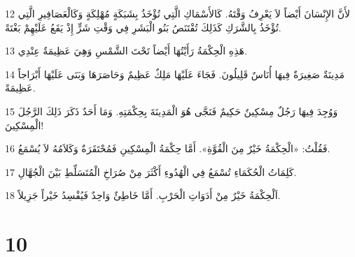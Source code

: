 \par 12 لأَنَّ الإِنْسَانَ أَيْضاً لاَ يَعْرِفُ وَقْتَهُ. كَالأَسْمَاكِ الَّتِي تُؤْخَذُ بِشَبَكَةٍ مُهْلِكَةٍ وَكَالْعَصَافِيرِ الَّتِي تُؤْخَذُ بِالشَّرَكِ كَذَلِكَ تُقْتَنَصُ بَنُو الْبَشَرِ فِي وَقْتِ شَرٍّ إِذْ يَقَعُ عَلَيْهِمْ بَغْتَةً.
\par 13 هَذِهِ الْحِكْمَةُ رَأَيْتُهَا أَيْضاً تَحْتَ الشَّمْسِ وَهِيَ عَظِيمَةٌ عِنْدِي.
\par 14 مَدِينَةٌ صَغِيرَةٌ فِيهَا أُنَاسٌ قَلِيلُونَ. فَجَاءَ عَلَيْهَا مَلِكٌ عَظِيمٌ وَحَاصَرَهَا وَبَنَى عَلَيْهَا أَبْرَاجاً عَظِيمَةً.
\par 15 وَوُجِدَ فِيهَا رَجُلٌ مِسْكِينٌ حَكِيمٌ فَنَجَّى هُوَ الْمَدِينَةَ بِحِكْمَتِهِ. وَمَا أَحَدٌ ذَكَرَ ذَلِكَ الرَّجُلَ الْمِسْكِينَ!
\par 16 فَقُلْتُ: «الْحِكْمَةُ خَيْرٌ مِنَ الْقُوَّةِ». أَمَّا حِكْمَةُ الْمِسْكِينِ فَمُحْتَقَرَةٌ وَكَلاَمُهُ لاَ يُسْمَعُ.
\par 17 كَلِمَاتُ الْحُكَمَاءِ تُسْمَعُ فِي الْهُدُوءِ أَكْثَرَ مِنْ صُرَاخِ الْمُتَسَلِّطِ بَيْنَ الْجُهَّالِ.
\par 18 اَلْحِكْمَةُ خَيْرٌ مِنْ أَدَوَاتِ الْحَرْبِ. أَمَّا خَاطِئٌ وَاحِدٌ فَيُفْسِدُ خَيْراً جَزِيلاً.

\chapter{10}

